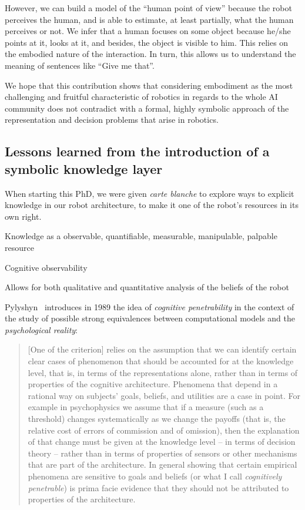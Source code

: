 However, we can build a model of the ``human point of view'' because the robot
perceives the human, and is able to estimate, at least partially, what the
human perceives or not. We infer that a human focuses on some object because
he/she points at it, looks at it, and besides, the object is visible to him.
This relies on the embodied nature of the interaction. In turn, this allows us
to understand the meaning of sentences like ``Give me that''.

We hope that this contribution shows that considering embodiment as the most
challenging and fruitful characteristic of robotics in regards to the whole AI
community does not contradict with a formal, highly symbolic approach of the
representation and decision problems that arise in robotics. 


\subsection{Lessons learned from the introduction of a symbolic knowledge layer}

When starting this PhD, we were given \emph{carte blanche} to explore ways to
explicit knowledge in our robot architecture, to make it one of the robot's
resources in its own right.


Knowledge as a observable, quantifiable, measurable, manipulable, palpable resource


Cognitive observability

Allows for both qualitative and quantitative analysis of the beliefs of the robot

Pylyshyn~\cite{Pylyshyn1989} introduces in 1989 the idea of \emph{cognitive
penetrability} in the context of the study of possible strong equivalences
between computational models and the \emph{psychological reality}:

\begin{quote}

    [One of the criterion] relies on the assumption that we can identify
    certain clear cases of phenomenon that should be accounted for at the
    knowledge level, that is, in terms of the representations alone, rather
    than in terms of properties of the cognitive architecture. Phenomena that
    depend in a rational way on subjects' goals, beliefs, and utilities are a
    case in point. For example in psychophysics we assume that if a measure
    (such as a threshold) changes systematically as we change the payoffs (that
    is, the relative cost of errors of commission and of omission), then the
    explanation of that change must be given at the knowledge level -- in terms
    of decision theory -- rather than in terms of properties of sensors or
    other mechanisms that are part of the architecture. In general showing that
    certain empirical phenomena are sensitive to goals and beliefs (or what I
    call \emph{cognitively penetrable}) is prima facie evidence that they
    should not be attributed to properties of the architecture.

\end{quote}

